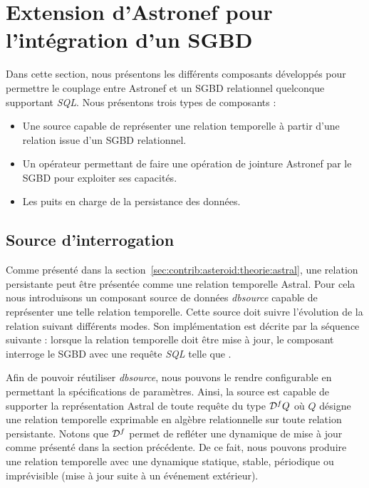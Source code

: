 \section{Extension d'Astronef pour l'intégration d'un SGBD}\label{sec:contrib:asteroid:composants}
Dans cette section, nous présentons les différents composants développés pour permettre le couplage entre Astronef et un SGBD relationnel quelconque supportant \textit{SQL}. Nous présentons trois types de composants :
\begin{itemize}
	\item Une source capable de représenter une relation temporelle à partir d'une relation issue d'un SGBD relationnel. 
	\item Un opérateur permettant de faire une opération de jointure Astronef par le SGBD pour exploiter ses capacités. 
	\item Les puits en charge de la persistance des données.
\end{itemize}

\subsection{Source d'interrogation}
Comme présenté dans la section~\ref{sec:contrib:asteroid:theorie:astral}, une relation persistante peut être présentée comme une relation temporelle Astral. Pour cela nous introduisons un composant source de données \textit{dbsource} capable de représenter une telle relation temporelle. Cette source doit suivre l'évolution de la relation suivant différents modes. Son implémentation est décrite par la séquence suivante : lorsque la relation temporelle doit être mise à jour, le composant interroge le SGBD avec une requête \textit{SQL} telle que .

Afin de pouvoir réutiliser \textit{dbsource}, nous pouvons le rendre configurable en permettant la spécifications de paramètres. Ainsi, la source est capable de supporter la représentation Astral de toute requête du type $\mathcal{D}^f Q$ où $Q$ désigne une relation temporelle exprimable en algèbre relationnelle sur toute relation persistante. Notons que $\mathcal{D}^f$ permet de refléter une dynamique de mise à jour comme présenté dans la section précédente. De ce fait, nous pouvons produire une relation temporelle avec une dynamique statique, stable, périodique ou imprévisible (mise à jour suite à un événement extérieur).

